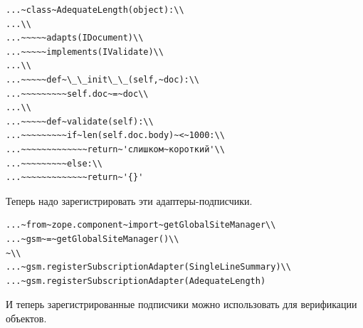 \documentclass[a4paper,openany,twoside,draft]{book}
\begin{document}
\begin{verbatim}
...~class~AdequateLength(object):\\
...\\
...~~~~~adapts(IDocument)\\
...~~~~~implements(IValidate)\\
...\\
...~~~~~def~\_\_init\_\_(self,~doc):\\
...~~~~~~~~~self.doc~=~doc\\
...\\
...~~~~~def~validate(self):\\
...~~~~~~~~~if~len(self.doc.body)~<~1000:\\
...~~~~~~~~~~~~~return~'слишком~короткий'\\
...~~~~~~~~~else:\\
...~~~~~~~~~~~~~return~'{}'
\end{verbatim}

Теперь надо зарегистрировать эти адаптеры-подписчики.

\begin{verbatim}
...~from~zope.component~import~getGlobalSiteManager\\
...~gsm~=~getGlobalSiteManager()\\
~\\
...~gsm.registerSubscriptionAdapter(SingleLineSummary)\\
...~gsm.registerSubscriptionAdapter(AdequateLength)
\end{verbatim}

И теперь зарегистрированные подписчики можно использовать для
верификации объектов.
\end{document}
